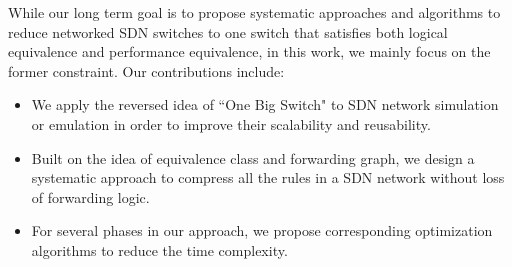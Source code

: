 While our long term goal is to propose systematic approaches and algorithms to reduce
networked SDN switches to one switch that satisfies both logical equivalence and performance
equivalence, in this work, we mainly focus on the former constraint.
Our contributions include:
\begin{itemize}
\item We apply the reversed idea of ``One Big Switch"\cite{OneBigSwitchAbstraction}
        to SDN network simulation or emulation in order to
        improve their scalability and reusability.
\item Built on the idea of equivalence class and forwarding graph, we design
        a systematic approach to compress all the rules in a SDN network without
        loss of forwarding logic.
\item For several phases in our approach, we propose corresponding optimization
        algorithms to reduce the time complexity.
\end{itemize}


